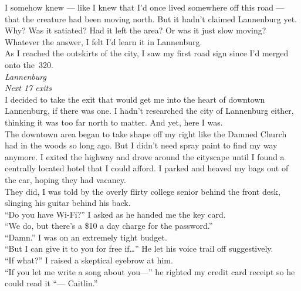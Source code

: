 \documentclass[a5paper]{scrartcl}
\begin{document}
I somehow knew --- like I knew that I'd once lived somewhere off this road --- that the creature had been moving north. But it hadn't claimed Lannenburg yet. Why? Was it satiated? Had it left the area? Or was it just slow moving? Whatever the answer, I felt I'd learn it in Lannenburg.\\


As I reached the outskirts of the city, I saw my first road sign since I'd merged onto the~320.\\


\textit{Lannenburg}
\\


\textit{Next 17 exits}
\\


I decided to take the exit that would get me into the heart of downtown Lannenburg, if there was one. I hadn't researched the city of Lannenburg either, thinking it was too far north to matter. And yet, here I was.\\


The downtown area began to take shape off my right like the Damned Church had in the woods so long ago. But I didn't need spray paint to find my way anymore. I exited the highway and drove around the cityscape until I found a centrally located hotel that I could afford. I parked and heaved my bags out of the car, hoping they had vacancy.\\


They did, I was told by the overly flirty college senior behind the front desk, slinging his guitar behind his back.\\


\enquote{Do you have Wi-Fi?} I asked as he handed me the key card.\\


\enquote{We do, but there's a \$10 a day charge for the password.}\\


\enquote{Damn.} I was on an extremely tight budget.\\


\enquote{But I can give it to you for free if\dots } He let his voice trail off suggestively.\\


\enquote{If what?} I raised a skeptical eyebrow at him.\\


\enquote{If you let me write a song about you---} he righted my credit card receipt so he could read it \enquote{--- Caitlin.}\\
\end{document}
